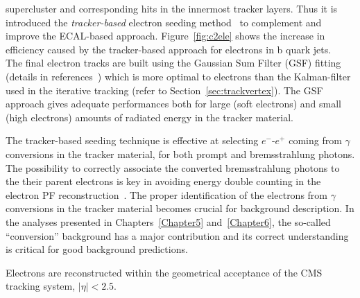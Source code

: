 supercluster and corresponding hits in the innermost tracker layers.
Thus it is introduced the \emph{tracker-based} electron seeding
method~\cite{CMS:particleflow} to complement and improve the
ECAL-based approach. Figure~\ref{fig:c2ele} shows the increase in efficiency caused by the tracker-based approach for electrons in b quark jets.\\
The final electron tracks are built using the Gaussian Sum Filter
(GSF) fitting (details in references~\cite{CMS:particleflow, Adam_2005}) which is more optimal to electrons than the Kalman-filter used
in the iterative tracking (refer to
Section~\ref{sec:trackvertex}). The GSF approach gives adequate
performances both for large (\ie soft electrons) and small (\ie high \pt electrons) amounts of radiated energy in the
tracker material.

The tracker-based seeding technique is effective at selecting $e^{-}$-$e^{+}$ coming from $\gamma$ conversions
in the tracker material, for both prompt and bremsstrahlung
photons. The possibility to correctly associate the converted
bremsstrahlung photons
to the their parent electrons is key in avoiding energy double
counting in the electron PF reconstruction~\cite{CMS:particleflow}. The proper identification
of the electrons from $\gamma$ conversions
in the tracker material becomes crucial for background description. In
the analyses presented in
Chapters~\ref{Chapter5} and~\ref{Chapter6}, the so-called
``conversion'' background has a major contribution and its correct
understanding is critical for good background
predictions.

Electrons are reconstructed within the geometrical acceptance of the
CMS tracking system, $|\eta|<2.5$.

